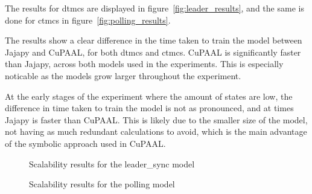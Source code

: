 The results for \glspl{dtmc} are displayed in figure~\autoref{fig:leader_results}, and the same is done for \glspl{ctmc} in figure~\autoref{fig:polling_results}.

The results show a clear difference in the time taken to train the model between Jajapy and CuPAAL, for both \glspl{dtmc} and \glspl{ctmc}.
CuPAAL is significantly faster than Jajapy, across both models used in the experiments.
This is especially noticable as the models grow larger throughout the experiment.

At the early stages of the experiment where the amount of states are low, the difference in time taken to train the model is not as pronounced, and at times Jajapy is faster than CuPAAL.
This is likely due to the smaller size of the model, not having as much redundant calculations to avoid, which is the main advantage of the symbolic approach used in CuPAAL.

\begin{figure}
    \centering
    \caption{Scalability results for the leader\_sync model}
    \label{fig:leader_results}
\end{figure}

\begin{figure}
    \centering
    \caption{Scalability results for the polling model}
    \label{fig:polling_results}
\end{figure}